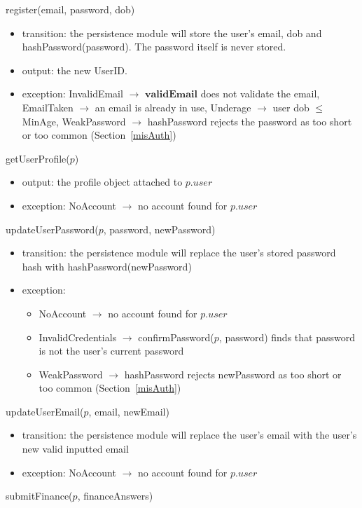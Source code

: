 \documentclass[12pt, titlepage]{article}
\begin{document}
\noindent register(email, password, dob) 
\begin{itemize}
    \item transition: the persistence module will store the user's email, dob and hashPassword(password). The password itself is never stored.
    \item output: the new UserID.
    \item exception: InvalidEmail $\longrightarrow$ $\mathbf{validEmail}$ does not validate the email, EmailTaken $\longrightarrow$ an email is already in use, Underage $\longrightarrow$ user dob $\leq$ MinAge, WeakPassword $\longrightarrow$ hashPassword rejects the password as too short or too common (Section~\ref{misAuth})
\end{itemize}
\noindent getUserProfile($p$)
\begin{itemize}
    \item output: the profile object attached to $p.\mathit{user}$
    \item exception: NoAccount $\longrightarrow$ no account found for $p.\mathit{user}$
\end{itemize}
\noindent updateUserPassword($p$, password, newPassword)
\begin{itemize}
    \item transition: the persistence module will replace the user's stored password hash with hashPassword(newPassword)
    \item exception:
    \begin{itemize}
        \item NoAccount $\longrightarrow$ no account found for $p.\mathit{user}$
        \item InvalidCredentials $\longrightarrow$ confirmPassword($p$, password) finds that password is not the user's current password
        \item WeakPassword $\longrightarrow$ hashPassword rejects newPassword as too short or too common (Section~\ref{misAuth})
    \end{itemize}
\end{itemize}
\noindent updateUserEmail($p$, email, newEmail)
\begin{itemize}
    \item transition: the persistence module will replace the user's email with the user's new valid inputted email
    \item exception: NoAccount $\longrightarrow$ no account found for $p.\mathit{user}$
\end{itemize}
\noindent submitFinance($p$, financeAnswers)
\end{document}
